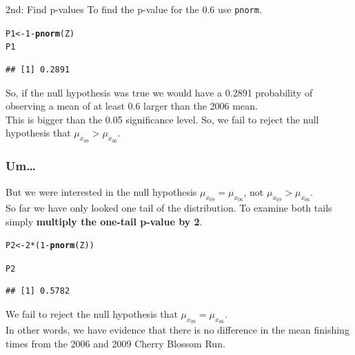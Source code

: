 \documentclass{beamer}\usepackage{graphicx, color}
\makeatletter
\newcommand{\hlfunctioncall}[1]{\textcolor[rgb]{0.501960784313725,0,0.329411764705882}{\textbf{#1}}}%
\newenvironment{kframe}{%
 \def\at@end@of@kframe{}%
 \ifinner\ifhmode%
  \def\at@end@of@kframe{\end{minipage}}%
  \begin{minipage}{\columnwidth}%
 \fi\fi%
 \def\FrameCommand##1{\hskip\@totalleftmargin \hskip-\fboxsep
 \colorbox{shadecolor}{##1}\hskip-\fboxsep
     \hskip-\linewidth \hskip-\@totalleftmargin \hskip\columnwidth}%
 \MakeFramed {\advance\hsize-\width
   \@totalleftmargin\z@ \linewidth\hsize
   \@setminipage}}%
 {\par\unskip\endMakeFramed%
 \at@end@of@kframe}
\newenvironment{knitrout}{}{} %
\makeatother
\begin{document}
\begin{frame}[fragile]
{\LARGE{2nd: Find p-values}}
  To find the p-value for the 0.6 use \texttt{pnorm}.
\begin{knitrout}
\color{fgcolor}\begin{kframe}
\begin{alltt}
P1 <- 1 - \hlfunctioncall{pnorm}(Z)
P1
\end{alltt}
\begin{verbatim}
## [1] 0.2891
\end{verbatim}
\end{kframe}
\end{knitrout}

So, if the null hypothesis was true we would have a 0.2891 probability of observing a mean of at least 0.6 larger than the 2006 mean. \\[0.25cm]
This is bigger than the 0.05 significance level. So, we fail to reject the null hypothesis that $\mu_{{x}_{09}} > \mu_{{x}_{06}}$.
\end{frame}

\begin{frame}[fragile]
  \frametitle{Um\ldots}
  But we were interested in the null hypothesis $\mu_{{x}_{09}} = \mu_{{x}_{06}}$, not $\mu_{{x}_{09}} > \mu_{{x}_{06}}$. \\[0.5cm]
  So far we have only looked one tail of the distribution. To examine both tails simply {\bf{multiply the one-tail p-value by 2}}.
\begin{knitrout}
\color{fgcolor}\begin{kframe}
\begin{alltt}
P2 <- 2 * (1 - \hlfunctioncall{pnorm}(Z))

P2
\end{alltt}
\begin{verbatim}
## [1] 0.5782
\end{verbatim}
\end{kframe}
\end{knitrout}

We fail to reject the null hypothesis that $\mu_{{x}_{09}} = \mu_{{x}_{06}}$. \\[0.25cm]
In other words, we have evidence that there is no difference in the mean finishing times from the 2006 and 2009 Cherry Blossom Run.

\end{frame}

\end{document}
